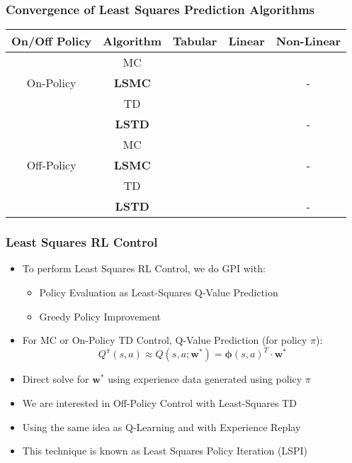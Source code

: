 \documentclass{beamer}
\newcommand{\cmark}{\ding{51}}%
\newcommand{\xmark}{\ding{55}}%
\begin{document}
\begin{frame}
\frametitle{Convergence of Least Squares Prediction Algorithms}
\pause
\begin{center}
      \begin{tabular}{ccccc}
      \hline
      On/Off Policy & Algorithm & Tabular & Linear & Non-Linear \\ \hline
      \multirow{3}{*}{On-Policy} & MC & \cmark & \cmark & \cmark \\
      & {\bf LSMC} & \cmark & \cmark & - \\
      & TD & \cmark & \cmark & \xmark \\ 
      & {\bf LSTD} & \cmark & \cmark & - \\ \hline
      \multirow{3}{*}{Off-Policy} & MC & \cmark & \cmark & \cmark \\
      & {\bf LSMC} & \cmark & \xmark & - \\
      & TD & \cmark & \xmark & \xmark \\
      & {\bf LSTD} & \cmark & \xmark & - \\ \hline
      \end{tabular}
\end{center}      
\end{frame}

\begin{frame}
\frametitle{Least Squares RL Control}
\pause
\begin{itemize}[<+->]
\item To perform Least Squares RL Control, we do GPI with:
\begin{itemize}[<+->]
\item Policy Evaluation as Least-Squares Q-Value Prediction
\item Greedy Policy Improvement
\end{itemize}
\item For MC or On-Policy TD Control, Q-Value Prediction (for policy $\pi$):
$$Q^{\pi}(s,a) \approx Q(s,a;\bm{w}^*) = \bm{\phi}(s,a)^T \cdot \bm{w}^*$$
\item Direct solve for $\bm{w}^*$ using experience data generated using policy $\pi$
\item We are interested in Off-Policy Control with Least-Squares TD
\item Using the same idea as Q-Learning and with Experience Replay
\item This technique is known as Least Squares Policy Iteration (LSPI)
\end{itemize}
\end{frame}
\end{document}
